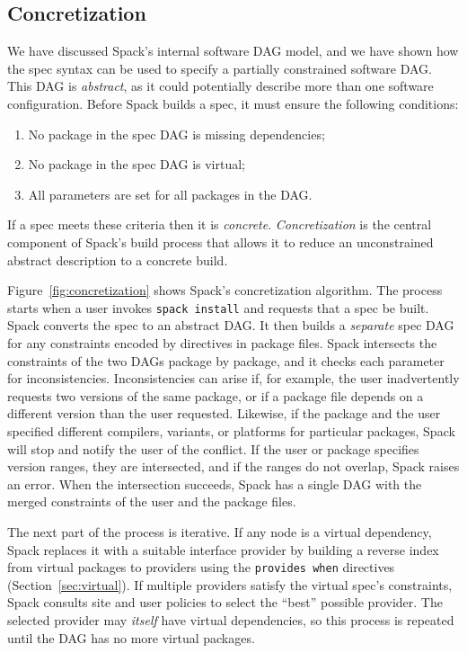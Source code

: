 
\subsection{Concretization}
\label{sec:concretization}

We have discussed Spack's internal software DAG model, and we have shown
how the spec syntax can be used to specify a partially constrained
software DAG.  This DAG is {\it abstract}, as it could potentially
describe more than one software configuration. Before Spack builds a spec, it
must ensure the following conditions:
\begin{enumerate}
\item No package in the spec DAG is missing dependencies;
\item No package in the spec DAG is virtual;
\item All parameters are set for all packages in the DAG.
\end{enumerate}
If a spec meets these criteria then it is {\it concrete}.
{\it Concretization} is the central component of Spack's build
process that allows it to reduce an unconstrained abstract
description to a concrete build.

Figure~\ref{fig:concretization} shows Spack's concretization algorithm.
The process starts when a user invokes {\tt spack install} and requests that a
spec be built.  Spack converts the spec to an abstract DAG.
It then builds a {\it separate} spec DAG for any constraints encoded
by directives in package files.
%
Spack intersects the constraints of the two DAGs package by package, and it
checks each parameter for inconsistencies.  Inconsistencies can arise if, 
for example,
the user inadvertently requests two versions of the same package, or if a
package file depends on a different version than the user requested.
Likewise, if the package and the user specified different compilers, variants,
or platforms for particular packages, Spack will stop and notify
the user of the conflict. If the user or package specifies version ranges,
they are intersected, and if the ranges do not overlap, Spack raises an error.
When the intersection succeeds, Spack has a single DAG with the merged
constraints of the user and the package files.

The next part of the process is iterative.
If any node is a virtual dependency, Spack replaces it with a
suitable interface provider by building a reverse
index from virtual packages to providers using the {\tt provides when}
directives (Section~\ref{sec:virtual}). If multiple providers
satisfy the virtual spec's constraints,
Spack consults site and user policies to select the ``best'' possible
provider.  The selected provider may {\it itself} have virtual dependencies,
so this process is repeated until the DAG has no more virtual packages.

